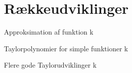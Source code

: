 \section*{Rækkeudviklinger}
\begin{opgave}[1]{Approksimation af funktion}
k
\end{opgave}	
\begin{opgave}[2]{Taylorpolynomier for simple funktioner}
k
\end{opgave}
\begin{opgave}[3]{Flere gode Taylorudviklinger}
k
\end{opgave}